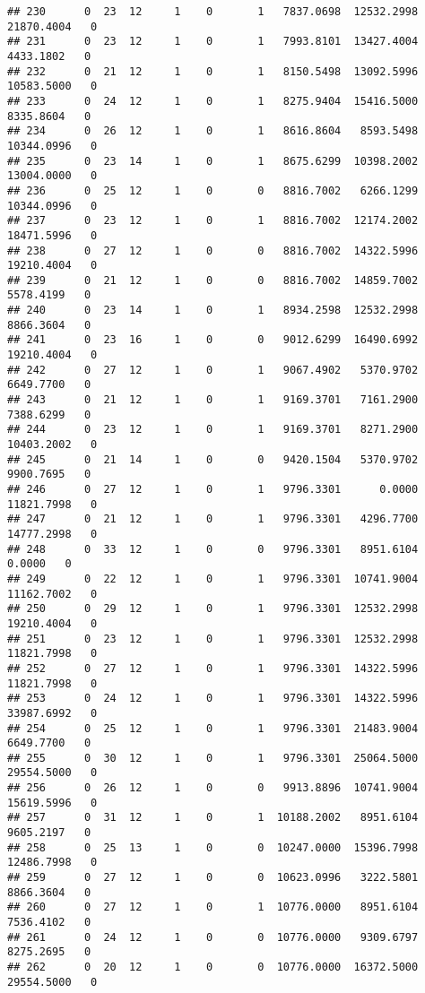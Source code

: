 \documentclass[
]{article}
\begin{document}
\begin{enumerate}
\begin{verbatim}
## 230      0  23  12     1    0       1   7837.0698  12532.2998  21870.4004   0
## 231      0  23  12     1    0       1   7993.8101  13427.4004   4433.1802   0
## 232      0  21  12     1    0       1   8150.5498  13092.5996  10583.5000   0
## 233      0  24  12     1    0       1   8275.9404  15416.5000   8335.8604   0
## 234      0  26  12     1    0       1   8616.8604   8593.5498  10344.0996   0
## 235      0  23  14     1    0       1   8675.6299  10398.2002  13004.0000   0
## 236      0  25  12     1    0       0   8816.7002   6266.1299  10344.0996   0
## 237      0  23  12     1    0       1   8816.7002  12174.2002  18471.5996   0
## 238      0  27  12     1    0       0   8816.7002  14322.5996  19210.4004   0
## 239      0  21  12     1    0       0   8816.7002  14859.7002   5578.4199   0
## 240      0  23  14     1    0       1   8934.2598  12532.2998   8866.3604   0
## 241      0  23  16     1    0       0   9012.6299  16490.6992  19210.4004   0
## 242      0  27  12     1    0       1   9067.4902   5370.9702   6649.7700   0
## 243      0  21  12     1    0       1   9169.3701   7161.2900   7388.6299   0
## 244      0  23  12     1    0       1   9169.3701   8271.2900  10403.2002   0
## 245      0  21  14     1    0       0   9420.1504   5370.9702   9900.7695   0
## 246      0  27  12     1    0       1   9796.3301      0.0000  11821.7998   0
## 247      0  21  12     1    0       1   9796.3301   4296.7700  14777.2998   0
## 248      0  33  12     1    0       0   9796.3301   8951.6104      0.0000   0
## 249      0  22  12     1    0       1   9796.3301  10741.9004  11162.7002   0
## 250      0  29  12     1    0       1   9796.3301  12532.2998  19210.4004   0
## 251      0  23  12     1    0       1   9796.3301  12532.2998  11821.7998   0
## 252      0  27  12     1    0       1   9796.3301  14322.5996  11821.7998   0
## 253      0  24  12     1    0       1   9796.3301  14322.5996  33987.6992   0
## 254      0  25  12     1    0       1   9796.3301  21483.9004   6649.7700   0
## 255      0  30  12     1    0       1   9796.3301  25064.5000  29554.5000   0
## 256      0  26  12     1    0       0   9913.8896  10741.9004  15619.5996   0
## 257      0  31  12     1    0       1  10188.2002   8951.6104   9605.2197   0
## 258      0  25  13     1    0       0  10247.0000  15396.7998  12486.7998   0
## 259      0  27  12     1    0       0  10623.0996   3222.5801   8866.3604   0
## 260      0  27  12     1    0       1  10776.0000   8951.6104   7536.4102   0
## 261      0  24  12     1    0       0  10776.0000   9309.6797   8275.2695   0
## 262      0  20  12     1    0       0  10776.0000  16372.5000  29554.5000   0

\end{verbatim}
\end{enumerate}
\end{document}
